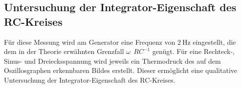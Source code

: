 \subsection{Untersuchung der Integrator-Eigenschaft des RC-Kreises}
Für diese Messung wird am Generator eine Frequenz von $\SI{2}{\hertz}$ eingestellt, die dem in der Theorie erwähnten Grenzfall $\omega \>\> RC^{-1}$ genügt. Für eine Rechteck-, Sinus- und Dreiecksspannung wird
jeweils ein Thermodruck des auf dem Oszillosgraphen erkennbaren Bildes erstellt. Dieser ermöglicht eine qualitative Untersuchung der
Integrator-Eigenschaft des RC-Kreises.

